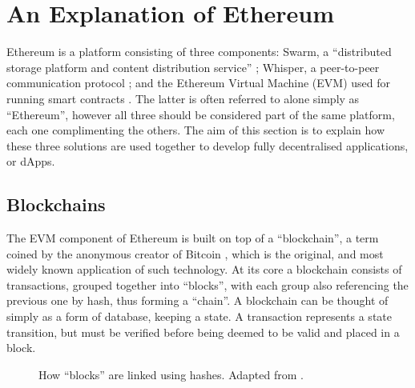 \section{An Explanation of Ethereum}

Ethereum is a platform consisting of three components: Swarm, a “distributed storage platform and content distribution service” \cite{Swarm}; Whisper, a peer-to-peer communication protocol \cite{Whisper}; and the Ethereum Virtual Machine (EVM) used for running smart contracts \cite{Ethereum}. The latter is often referred to alone simply as “Ethereum”, however all three should be considered part of the same platform, each one complimenting the others. The aim of this section is to explain how these three solutions are used together to develop fully decentralised applications, or dApps.

\subsection{Blockchains}

The EVM component of Ethereum is built on top of a “blockchain”, a term coined by the anonymous creator of Bitcoin \cite{Bitcoin}, which is the original, and most widely known application of such technology. At its core a blockchain consists of transactions, grouped together into “blocks”, with each group also referencing the previous one by hash, thus forming a “chain”. A blockchain can be thought of simply as a form of database, keeping a state. A transaction represents a state transition, but must be verified before being deemed to be valid and placed in a block.

\begin{figure}[h!]
\centering
{}
\caption{How \enquote{blocks} are linked using hashes. Adapted from \cite{Bitcoin}.}
\end{figure}

